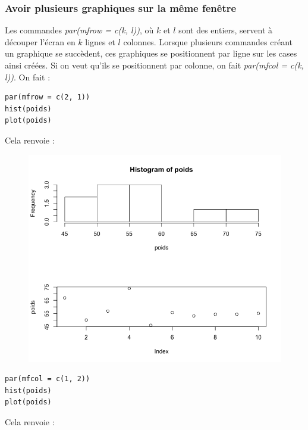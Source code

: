 \subsubsection{Avoir plusieurs graphiques sur la même fenêtre}
Les commandes \textit{par(mfrow = c(k, l))}, où $k$ et $l$ sont des entiers, servent à découper l'écran en $k$ lignes et $l$ colonnes.\newline
Lorsque plusieurs commandes créant un graphique se succèdent, ces graphiques se positionnent par ligne sur les cases ainsi créées.\newline
Si on veut qu'ils se positionnent par colonne, on fait \textit{par(mfcol = c(k, l))}.\newline
On fait :
\begin{lstlisting}[language=html]
par(mfrow = c(2, 1))
hist(poids)
plot(poids)
\end{lstlisting}
Cela renvoie :
\begin{figure}[H]\begin{center}\includegraphics[scale=0.4]{ilu/gra52.png}\end{center}\end{figure}
\begin{lstlisting}[language=html]
par(mfcol = c(1, 2))
hist(poids)
plot(poids)
\end{lstlisting}
Cela renvoie :
